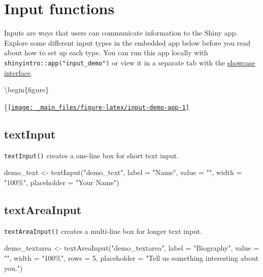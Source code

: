 \documentclass[
]{book}
\newenvironment{Shaded}{\begin{snugshade}}{\end{snugshade}}
\newcommand{\AttributeTok}[1]{\textcolor[rgb]{0.77,0.63,0.00}{#1}}
\newcommand{\DecValTok}[1]{\textcolor[rgb]{0.00,0.00,0.81}{#1}}
\newcommand{\FunctionTok}[1]{\textcolor[rgb]{0.00,0.00,0.00}{#1}}
\newcommand{\NormalTok}[1]{#1}
\newcommand{\OtherTok}[1]{\textcolor[rgb]{0.56,0.35,0.01}{#1}}
\newcommand{\StringTok}[1]{\textcolor[rgb]{0.31,0.60,0.02}{#1}}
\begin{document}
\hypertarget{input-functions}{%
\section{Input functions}\label{input-functions}}

Inputs are ways that users can communicate information to the Shiny app. Explore some different input types in the embedded app below before you read about how to set up each type. You can run this app locally with \texttt{shinyintro::app("input\_demo")} or view it in a separate tab with the \href{https://shiny.psy.gla.ac.uk/debruine/input_demo/}{showcase interface}.

\textbackslash begin\{figure\}

\{\centering \href{https://shiny.psy.gla.ac.uk/debruine/input_demo/}{\texttt{[image: \_main\_files/figure-latex/input-demo-app-1]} }

\hypertarget{textinput}{%
\subsection{textInput}\label{textinput}}

\texttt{textInput()} creates a one-line box for short text input.

\begin{Shaded}
\begin{Highlighting}[]
\NormalTok{demo\_text }\OtherTok{\textless{}{-}} 
  \FunctionTok{textInput}\NormalTok{(}\StringTok{"demo\_text"}\NormalTok{, }
            \AttributeTok{label =} \StringTok{"Name"}\NormalTok{, }
            \AttributeTok{value =} \StringTok{""}\NormalTok{, }
            \AttributeTok{width =} \StringTok{"100\%"}\NormalTok{,}
            \AttributeTok{placeholder =} \StringTok{"Your Name"}\NormalTok{)}
\end{Highlighting}
\end{Shaded}

\hypertarget{textareainput}{%
\subsection{textAreaInput}\label{textareainput}}

\texttt{textAreaInput()} creates a multi-line box for longer text input.

\begin{Shaded}
\begin{Highlighting}[]
\NormalTok{demo\_textarea }\OtherTok{\textless{}{-}} 
  \FunctionTok{textAreaInput}\NormalTok{(}\StringTok{"demo\_textarea"}\NormalTok{, }
                \AttributeTok{label =} \StringTok{"Biography"}\NormalTok{, }
                \AttributeTok{value =} \StringTok{""}\NormalTok{,}
                \AttributeTok{width =} \StringTok{"100\%"}\NormalTok{,}
                \AttributeTok{rows =} \DecValTok{5}\NormalTok{, }
                \AttributeTok{placeholder =} \StringTok{"Tell us something interesting about you."}\NormalTok{)}
\end{Highlighting}
\end{Shaded}
\end{document}
